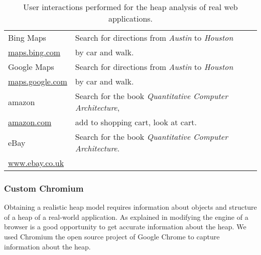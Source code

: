 \begin{table}
\begin{tabular}{l l}
		Bing Maps 				& Search for directions from \textit{Austin} to \textit{Houston}		\\ 
		\url{maps.bing.com} 	& by car and walk. 														\\ \midrule

		Google Maps				& Search for directions from \textit{Austin} to \textit{Houston}		\\ 
		\url{maps.google.com} 	& by car and walk. 														\\ \midrule

		amazon 					& Search for the book \textit{Quantitative Computer Architecture},		\\ 
		\url{amazon.com} 		& add to shopping cart, look at cart. 									\\ \midrule

		eBay 					& Search for the book \textit{Quantitative Computer Architecture}. 		\\ 
		\url{www.ebay.co.uk} 	& 																		\\ \bottomrule

	\end{tabular}
	\caption{User interactions performed for the heap analysis of real web applications.}
	\label{tab:real_world_apps}
\end{table}

		
\subsubsection{Custom Chromium} \label{sec:custom_chromium}
Obtaining a realistic \JS heap model requires information about objects and structure of a heap of a real-world \JS application. As explained in \cite{JSMeter2009} modifying the \JS engine of a browser is a good opportunity to get accurate information about the \JS heap. We used Chromium \cite{Chromium} the open source project of Google Chrome \cite{Chrome} to capture information about the \JS heap.

